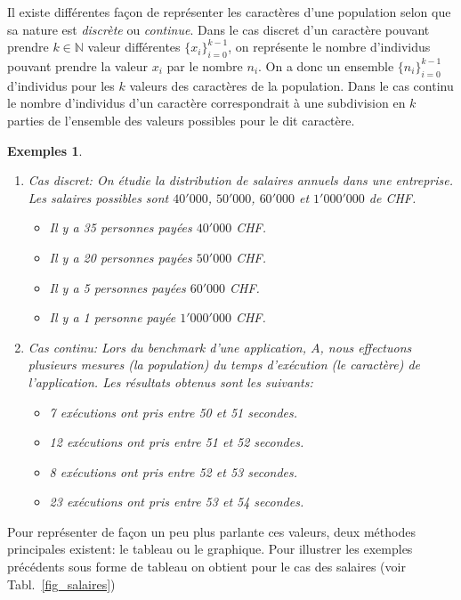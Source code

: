 \documentclass[a4paper,12pt]{book}
\renewcommand{\natural}{\mathbb{N}}
\newtheorem*{exemples}{Exemples}
\begin{document}
Il existe différentes façon de représenter les caractères d'une population selon que sa nature est \textit{discrète} 
ou \textit{continue}. Dans le cas discret d'un caractère pouvant prendre $k\in\natural$ valeur différentes $\{x_i\}_{i=0}^{k-1}$,
on représente le nombre d'individus pouvant prendre la valeur $x_i$ par le nombre $n_i$. On a donc un ensemble $\{n_i\}_{i=0}^{k-1}$
d'individus pour les $k$ valeurs des caractères de la population. Dans le cas continu le nombre d'individus d'un caractère
correspondrait à une subdivision en $k$ parties de l'ensemble des valeurs possibles pour le dit caractère.
\begin{exemples}\hfill\break
 \begin{enumerate}
  \item Cas discret: On étudie la distribution de salaires annuels dans une entreprise. 
  Les salaires possibles sont $40'000$, $50'000$, $60'000$ et $1'000'000$ de CHF.
  \begin{itemize}
   \item Il y a 35 personnes payées $40'000$ CHF. 
   \item Il y a 20 personnes payées $50'000$ CHF. 
   \item Il y a 5 personnes payées $60'000$ CHF. 
   \item Il y a 1 personne payée $1'000'000$ CHF.
  \end{itemize}

  \item Cas continu: Lors du benchmark d'une application, $A$, nous effectuons plusieurs mesures (la population) du temps d'exécution (le caractère) de l'application.
  Les résultats obtenus sont les suivants: 
  \begin{itemize}
   \item 7 exécutions ont pris entre 50 et 51 secondes.
   \item 12 exécutions ont pris entre 51 et 52 secondes.
   \item 8 exécutions ont pris entre 52 et 53 secondes.
   \item 23 exécutions ont pris entre 53 et 54 secondes.
  \end{itemize}

 \end{enumerate}

\end{exemples}
Pour représenter de façon un peu plus parlante ces valeurs, deux méthodes principales existent: le tableau ou le graphique.
Pour illustrer les exemples précédents sous forme de tableau on obtient pour le cas des salaires (voir Tabl.~\ref{fig_salaires})
\end{document}
